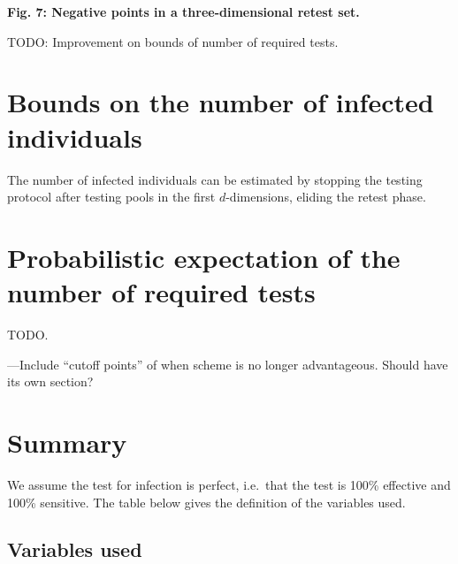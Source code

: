 \documentclass[letterpaper]{article}
\begin{document}
\textbf{Fig. 7: Negative points in a three-dimensional retest set.}

TODO: Improvement on bounds of number of required tests.

\hypertarget{bounds-on-the-number-of-infected-individuals}{%
\section{Bounds on the number of infected
	individuals}\label{bounds-on-the-number-of-infected-individuals}}

The number of infected individuals can be estimated by stopping the
testing protocol after testing pools in the first $d$-dimensions,
eliding the retest phase.

\hypertarget{probabilistic-expectation-of-the-number-of-required-tests}{%
\section{Probabilistic expectation of the number of required
	tests}\label{probabilistic-expectation-of-the-number-of-required-tests}}

TODO.

\hspace{0pt} ---Include ``cutoff points'' of when scheme is no longer
advantageous. Should have its own section?

\hypertarget{summary}{%
\section{Summary}\label{summary}}

We assume the test for infection is perfect, i.e.~that the test is 100\%
effective and 100\% sensitive. The table below gives the definition of
the variables used.

\hypertarget{variables-used}{%
\subsection{Variables used}\label{variables-used}}
\end{document}
